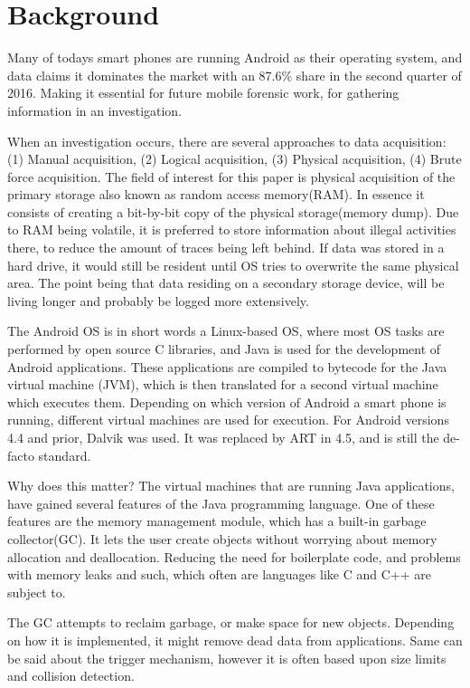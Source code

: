 \section{Background}
Many of todays smart phones are running Android as their operating system, and data claims it dominates the market with an 87.6\% share in the second quarter of 2016\cite{idc}. Making it essential for future mobile forensic work, for gathering information in an investigation.

When an investigation occurs, there are several approaches to data acquisition: (1) Manual acquisition, (2) Logical acquisition, (3) Physical acquisition, (4) Brute force acquisition. The field of interest for this paper is physical acquisition of the primary storage also known as random access memory(RAM). In essence it consists of creating a bit-by-bit copy of the physical storage(memory dump). Due to RAM being volatile, it is preferred to store information about illegal activities there, to reduce the amount of traces being left behind. If data was stored in a hard drive, it would still be resident until OS tries to overwrite the same physical area. The point being that data residing on a secondary storage device, will be living longer and probably be logged more extensively.

The Android OS is in short words a Linux-based OS, where most OS tasks are performed by open source C libraries, and Java is used for the development of Android applications. These applications are compiled to bytecode for the Java virtual machine (JVM), which is then translated for a second virtual machine which executes them. Depending on which version of Android a smart phone is running, different virtual machines are used for execution.
For Android versions 4.4 and prior, Dalvik was used. It was replaced by ART in 4.5, and is still the de-facto standard.

Why does this matter? The virtual machines that are running Java applications, have gained several features of the Java programming language. One of these features are the memory management module, which has a built-in garbage collector(GC). It lets the user create objects without worrying about memory allocation and deallocation. Reducing the need for boilerplate code, and problems with memory leaks and such, which often are languages like C and C++ are subject to. 

The GC attempts to reclaim garbage, or make space for new objects. Depending on how it is implemented, it might remove dead data from applications. Same can be said about the trigger mechanism, however it is often based upon size limits and collision detection.

